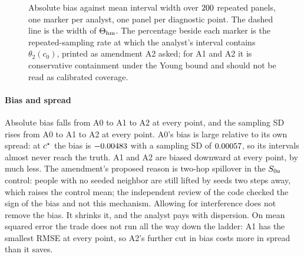 \begin{figure}[t]
\centering
{}
\caption{Absolute bias against mean interval width over $200$ repeated
panels, one marker per analyst, one panel per diagnostic point. The dashed line
is the width of $\Theta_{\mathrm{hm}}$. The percentage beside each marker is the
repeated-sampling rate at which the analyst's interval contains $\theta_2(c_0)$,
printed as amendment A2 asked; for A1 and A2 it is conservative containment under
the Young bound and should not be read as calibrated coverage.}
\label{fig:tradeoff}
\end{figure}

\paragraph{Bias and spread} Absolute bias falls from A0 to A1 to A2 at every
point, and the sampling SD rises from A0 to A1 to A2 at every point. A0's bias is
large relative to its own spread: at $c^\star$ the bias is $-0.00483$
with a sampling SD of $0.00057$, so its intervals almost never reach
the truth. A1 and A2 are biased downward at every point, by much less. The
amendment's proposed reason is two-hop spillover in the $S_{0a}$ control: people with
no seeded neighbor are still lifted by seeds two steps away, which raises the
control mean; the independent review of the code checked the sign of the bias and
not this mechanism. Allowing for interference does not remove the bias. It shrinks
it, and the analyst pays with dispersion. On mean squared error the trade does not
run all the way down the ladder: A1 has the smallest RMSE at every point, so A2's
further cut in bias costs more in spread than it saves.

